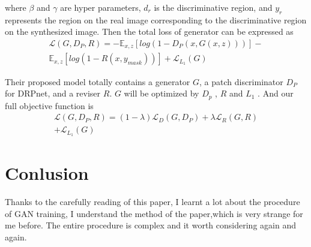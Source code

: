 \documentclass[10pt,twocolumn,letterpaper]{article}
\begin{document}
  where $\beta$ and $\gamma$ are hyper parameters, $d_r$ is the discriminative region, and $y_r$ represents the region on the real image corresponding to the discriminative region on the synthesized image. Then the total loss of generator can be expressed as
  \begin{equation}
  \begin{aligned}
  \mathcal{L}(G,D_P,R) = -\mathbb{E}_{x,z}[log(1-D_P(x,G(x,z)))]-\\\mathbb{E}_{x,z}[log(1-R(x,y_{mask}))]+\mathcal{L}_{L_1}(G)
  \end{aligned}
  \end{equation}\par
  Their proposed model totally contains a generator $G$, a patch discriminator $D_P$ for DRPnet, and a reviser $R$. $G$ will be optimized by $D_p$ , $R$ and $L_1$ . And our
  full objective function is
  \begin{equation}
  \begin{aligned}
  \mathcal{L}(G,D_P,R) =(1-\lambda)\mathcal{L}_D(G,D_P)+\lambda\mathcal{L}_R(G,R)\\\label{key}+\mathcal{L}_{L_1}(G)
  \end{aligned}
  \end{equation}


\section{Conlusion}
Thanks to the carefully reading of this paper, I learnt a lot about the procedure of GAN training, I understand the method of the paper,which is very strange for me before. The entire procedure is complex and it worth considering again and again.

{\small


}
\end{document}
